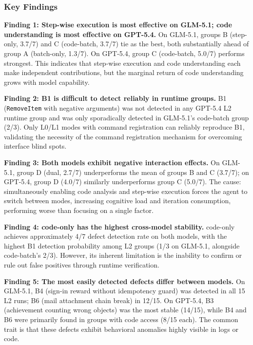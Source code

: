 \documentclass[sigconf,nonacm]{acmart}
\begin{document}
\subsubsection{Key Findings}

\textbf{Finding 1: Step-wise execution is most effective on GLM-5.1; code understanding is most effective on GPT-5.4.} On GLM-5.1, groups B (step-only, 3.7/7) and C (code-batch, 3.7/7) tie as the best, both substantially ahead of group A (batch-only, 1.3/7). On GPT-5.4, group C (code-batch, 5.0/7) performs strongest. This indicates that step-wise execution and code understanding each make independent contributions, but the marginal return of code understanding grows with model capability.

\textbf{Finding 2: B1 is difficult to detect reliably in runtime groups.} B1 (\texttt{RemoveItem} with negative arguments) was not detected in any GPT-5.4 L2 runtime group and was only sporadically detected in GLM-5.1's code-batch group (2/3). Only L0/L1 modes with command registration can reliably reproduce B1, validating the necessity of the command registration mechanism for overcoming interface blind spots.

\textbf{Finding 3: Both models exhibit negative interaction effects.} On GLM-5.1, group D (dual, 2.7/7) underperforms the mean of groups B and C (3.7/7); on GPT-5.4, group D (4.0/7) similarly underperforms group C (5.0/7). The cause: simultaneously enabling code analysis and step-wise execution forces the agent to switch between modes, increasing cognitive load and iteration consumption, performing worse than focusing on a single factor.

\textbf{Finding 4: code-only has the highest cross-model stability.} code-only achieves approximately 4/7 defect detection rate on both models, with the highest B1 detection probability among L2 groups (1/3 on GLM-5.1, alongside code-batch's 2/3). However, its inherent limitation is the inability to confirm or rule out false positives through runtime verification.

\textbf{Finding 5: The most easily detected defects differ between models.} On GLM-5.1, B4 (sign-in reward without idempotency guard) was detected in all 15 L2 runs; B6 (mail attachment chain break) in 12/15. On GPT-5.4, B3 (achievement counting wrong objects) was the most stable (14/15), while B4 and B6 were primarily found in groups with code access (8/15 each). The common trait is that these defects exhibit behavioral anomalies highly visible in logs or code.
\end{document}
